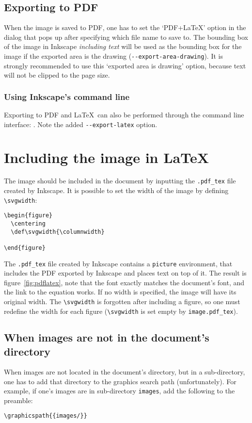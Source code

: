 \documentclass[final,3p,twocolumn]{elsarticle}
\begin{document}
\subsection{Exporting to PDF}
When the image is saved to PDF, one has to set the `PDF+LaTeX' option in the dialog that pops up after specifying which file name to save to.
The bounding box of the image in Inkscape \emph{including text} will be used as the bounding box for the image if the exported area is the drawing ({\small\verb|--export-area-drawing|}). It is strongly recommended to use this `exported area is drawing' option, because text will not be clipped to the page size.

\subsubsection{Using Inkscape's command line}
\label{sct:cmdline}
Exporting to PDF and \LaTeX\ can also be performed through the command line interface:
{\small{}}.
Note the added {\small\verb|--export-latex|} option.

\section{Including the image in LaTeX}

The image should be included in the document by inputting the {\small\verb|.pdf_tex|} file created by Inkscape. It is possible to set the width of the image by defining {\small\verb|\svgwidth|}:
\begin{verbatim}
\begin{figure} 
  \centering
  \def\svgwidth{\columnwidth}
  
\end{figure}
\end{verbatim}

The {\small\verb|.pdf_tex|} file created by Inkscape contains a {\small\verb|picture|} environment, that includes the PDF exported by Inkscape and places text on top of it. The result is figure~\ref{fig:pdflatex}, note that the font exactly matches the document's font, and the link to the equation works. If no width is specified, the image will have its original width. The {\small\verb|\svgwidth|} is forgotten after including a figure, so one must redefine the width for each figure ({\small\verb|\svgwidth|} is set empty by {\small\verb|image.pdf_tex|}).

\subsection{When images are not in the document's directory}
When images are not located in the document's directory, but in a sub-directory, one has to add that directory to the graphics search path (unfortunately). For example, if one's images are in sub-directory {\small\verb|images|}, add the following to the preamble:
\begin{verbatim}
\graphicspath{{images/}}
\end{verbatim}
\end{document}
